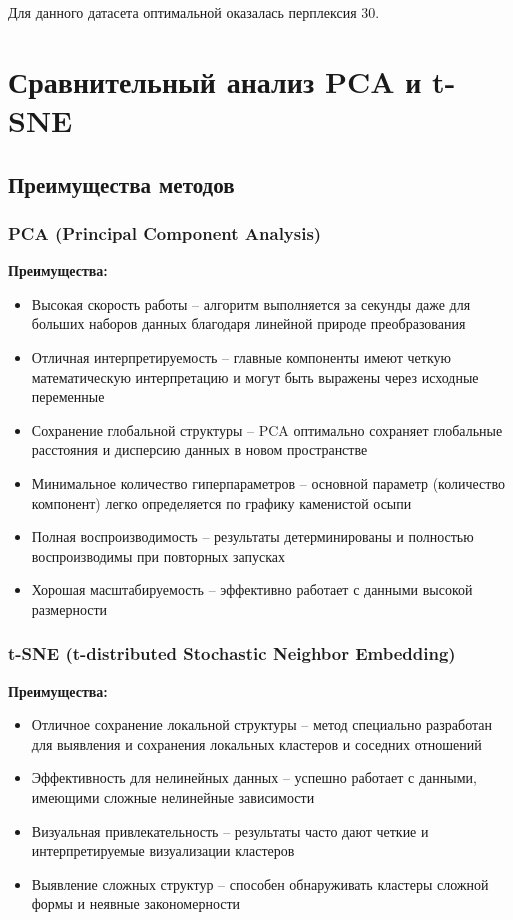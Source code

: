 \documentclass[12pt,a4paper]{report}
\begin{document}
Для данного датасета оптимальной оказалась перплексия 30.

\chapter{Сравнительный анализ PCA и t-SNE}

\section{Преимущества методов}

\subsection{PCA (Principal Component Analysis)}

\textbf{Преимущества:}
\begin{itemize}
    \item Высокая скорость работы -- алгоритм выполняется за секунды даже для больших наборов данных благодаря линейной природе преобразования
    \item Отличная интерпретируемость -- главные компоненты имеют четкую математическую интерпретацию и могут быть выражены через исходные переменные
    \item Сохранение глобальной структуры -- PCA оптимально сохраняет глобальные расстояния и дисперсию данных в новом пространстве
    \item Минимальное количество гиперпараметров -- основной параметр (количество компонент) легко определяется по графику каменистой осыпи
    \item Полная воспроизводимость -- результаты детерминированы и полностью воспроизводимы при повторных запусках
    \item Хорошая масштабируемость -- эффективно работает с данными высокой размерности
\end{itemize}

\subsection{t-SNE (t-distributed Stochastic Neighbor Embedding)}

\textbf{Преимущества:}
\begin{itemize}
    \item Отличное сохранение локальной структуры -- метод специально разработан для выявления и сохранения локальных кластеров и соседних отношений
    \item Эффективность для нелинейных данных -- успешно работает с данными, имеющими сложные нелинейные зависимости
    \item Визуальная привлекательность -- результаты часто дают четкие и интерпретируемые визуализации кластеров
    \item Выявление сложных структур -- способен обнаруживать кластеры сложной формы и неявные закономерности
\end{itemize}
\end{document}
